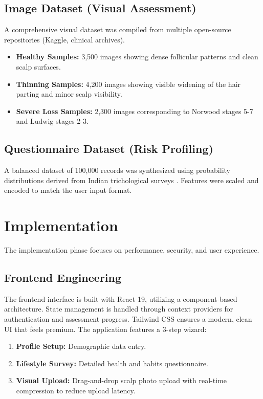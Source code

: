 \documentclass[conference]{IEEEtran}
\begin{document}
\subsection{Image Dataset (Visual Assessment)}
A comprehensive visual dataset was compiled from multiple open-source repositories (Kaggle, clinical archives).
\begin{itemize}
    \item \textbf{Healthy Samples:} 3,500 images showing dense follicular patterns and clean scalp surfaces.
    \item \textbf{Thinning Samples:} 4,200 images showing visible widening of the hair parting and minor scalp visibility.
    \item \textbf{Severe Loss Samples:} 2,300 images corresponding to Norwood stages 5-7 and Ludwig stages 2-3.
\end{itemize}

\subsection{Questionnaire Dataset (Risk Profiling)}
A balanced dataset of 100,000 records was synthesized using probability distributions derived from Indian trichological surveys \cite{sharma2018}. Features were scaled and encoded to match the user input format.

\section{Implementation}
The implementation phase focuses on performance, security, and user experience.

\subsection{Frontend Engineering}
The frontend interface is built with React 19, utilizing a component-based architecture. State management is handled through context providers for authentication and assessment progress. Tailwind CSS ensures a modern, clean UI that feels premium. The application features a 3-step wizard:
\begin{enumerate}
    \item \textbf{Profile Setup:} Demographic data entry.
    \item \textbf{Lifestyle Survey:} Detailed health and habits questionnaire.
    \item \textbf{Visual Upload:} Drag-and-drop scalp photo upload with real-time compression to reduce upload latency.
\end{enumerate}
\end{document}
